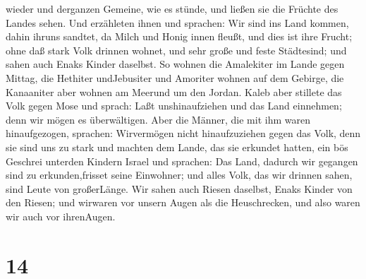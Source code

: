wieder und derganzen Gemeine, wie es stünde, und ließen sie die Früchte
des Landes sehen.  Und erzähleten ihnen und sprachen: Wir
sind ins Land kommen, dahin ihruns sandtet, da Milch und Honig innen
fleußt, und dies ist ihre Frucht;  ohne daß stark Volk
drinnen wohnet, und sehr große und feste Städtesind; und sahen auch
Enaks Kinder daselbst.  So wohnen die Amalekiter im Lande
gegen Mittag, die Hethiter undJebusiter und Amoriter wohnen auf dem
Gebirge, die Kanaaniter aber wohnen am Meerund um den Jordan.
 Kaleb aber stillete das Volk gegen Mose und sprach: Laßt
unshinaufziehen und das Land einnehmen; denn wir mögen es überwältigen.
 Aber die Männer, die mit ihm waren hinaufgezogen,
sprachen: Wirvermögen nicht hinaufzuziehen gegen das Volk, denn sie sind
uns zu stark  und machten dem Lande, das sie erkundet
hatten, ein bös Geschrei unterden Kindern Israel und sprachen: Das Land,
dadurch wir gegangen sind zu erkunden,frisset seine Einwohner; und alles
Volk, das wir drinnen sahen, sind Leute von großerLänge. 
Wir sahen auch Riesen daselbst, Enaks Kinder von den Riesen; und
wirwaren vor unsern Augen als die Heuschrecken, und also waren wir auch
vor ihrenAugen.

\hypertarget{section-13}{%
\section{14}\label{section-13}}

